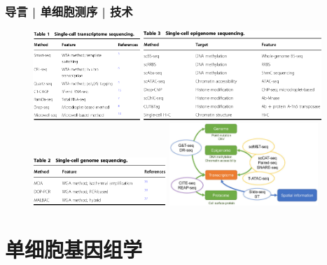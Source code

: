 \documentclass[11pt]{ctexbeamer}
\begin{document}
\begin{frame}
  \frametitle{导言 | 单细胞测序 | 技术}
  \begin{figure}
    \centering
    \includegraphics[width=0.36\textwidth]{sc_seq_RNA.png}\hspace{0.5em}
    \includegraphics[width=0.6\textwidth]{sc_seq_EPI.png}\\
    \vspace{1em}
    \includegraphics[width=0.45\textwidth]{sc_seq_DNA.png}\hspace{1em}
    \includegraphics[width=0.5\textwidth]{sc_seq_Multi.png}
  \end{figure}
\end{frame}


\section{单细胞基因组学}
\end{document}
